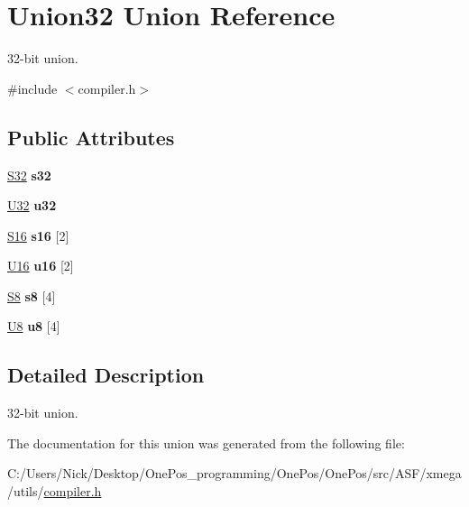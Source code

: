 \hypertarget{union_union32}{\section{Union32 Union Reference}
\label{union_union32}
}


32-\/bit union.  




{\ttfamily \#include $<$compiler.\-h$>$}

\subsection*{Public Attributes}
\begin{DoxyCompactItemize}
\item 
\hypertarget{union_union32_a435aab788ea7e552ed83572f419dbc07}{\hyperlink{group__group__xmega__utils_ga39c786017723555afb9e8b85accec0de}{S32} {\bfseries s32}}\label{union_union32_a435aab788ea7e552ed83572f419dbc07}

\item 
\hypertarget{union_union32_a765d5f0ef4f6df6a2f9971a6f0694020}{\hyperlink{group__group__xmega__utils_ga696390429f2f3b644bde8d0322a24124}{U32} {\bfseries u32}}\label{union_union32_a765d5f0ef4f6df6a2f9971a6f0694020}

\item 
\hypertarget{union_union32_a00d668a0687413baa854e1a24f6a86aa}{\hyperlink{group__group__xmega__utils_ga6d241ad21a823c90d4835380787db5d4}{S16} {\bfseries s16} \mbox{[}2\mbox{]}}\label{union_union32_a00d668a0687413baa854e1a24f6a86aa}

\item 
\hypertarget{union_union32_a893c7c4421429d923cdff35493391082}{\hyperlink{group__group__xmega__utils_ga0a0a322d5fa4a546d293a77ba8b4a71f}{U16} {\bfseries u16} \mbox{[}2\mbox{]}}\label{union_union32_a893c7c4421429d923cdff35493391082}

\item 
\hypertarget{union_union32_a48c08c56f8a08b8fdf8d7be939c5dc47}{\hyperlink{group__group__xmega__utils_gaf1475a0bb1962ef08dd1f78bd5dba87a}{S8} {\bfseries s8} \mbox{[}4\mbox{]}}\label{union_union32_a48c08c56f8a08b8fdf8d7be939c5dc47}

\item 
\hypertarget{union_union32_a6b35f70d76300a6253140bb89cc619ac}{\hyperlink{group__group__xmega__utils_gaa63ef7b996d5487ce35a5a66601f3e73}{U8} {\bfseries u8} \mbox{[}4\mbox{]}}\label{union_union32_a6b35f70d76300a6253140bb89cc619ac}

\end{DoxyCompactItemize}


\subsection{Detailed Description}
32-\/bit union. 

The documentation for this union was generated from the following file\-:\begin{DoxyCompactItemize}
\item 
C\-:/\-Users/\-Nick/\-Desktop/\-One\-Pos\-\_\-programming/\-One\-Pos/\-One\-Pos/src/\-A\-S\-F/xmega/utils/\hyperlink{compiler_8h}{compiler.\-h}\end{DoxyCompactItemize}
